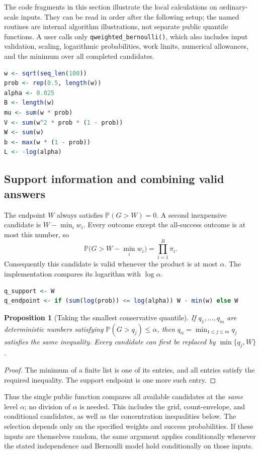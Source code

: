 \documentclass[11pt,letterpaper]{article}
\numberwithin{equation}{section}
\newtheorem{proposition}[theorem]{Proposition}
\theoremstyle{definition}
\theoremstyle{remark}
\begin{document}
The code fragments in this section illustrate the local calculations on
ordinary-scale inputs. They can be read in order after the following
setup; the named routines are internal algorithm illustrations, not
separate public quantile functions. A user calls only
\texttt{qweighted\_bernoulli()}, which also includes input validation,
scaling, logarithmic probabilities, work limits, numerical allowances,
and the minimum over all completed candidates.
\begin{lstlisting}[language=R]
w <- sqrt(seq_len(100))
prob <- rep(0.5, length(w))
alpha <- 0.025
B <- length(w)
mu <- sum(w * prob)
V <- sum(w^2 * prob * (1 - prob))
W <- sum(w)
b <- max(w * (1 - prob))
L <- -log(alpha)
\end{lstlisting}

\subsection{Support information and combining valid answers}

The endpoint $W$ always satisfies $\mathbb{P}(G>W)=0$. A second inexpensive
candidate is $W-\min_i w_i$. Every outcome except the all-success outcome is
at most this number, so
\begin{equation}
  \mathbb{P}\bigl(G>W-\min_i w_i\bigr)=\prod_{i=1}^B\pi_i.
  \label{eq:top-atom}
\end{equation}
Consequently this candidate is valid whenever the product is at most $\alpha$.
The implementation compares its logarithm with $\log\alpha$.
\begin{lstlisting}[language=R]
q_support <- W
q_endpoint <- if (sum(log(prob)) <= log(alpha)) W - min(w) else W
\end{lstlisting}

\begin{proposition}[Taking the smallest conservative quantile]
\label{prop:combine-quantiles}
If $q_1,\ldots,q_m$ are deterministic numbers satisfying
$\mathbb{P}(G>q_j)\le\alpha$, then
$q_\alpha=\min_{1\le j\le m}q_j$ satisfies the same inequality.
Every candidate can first be replaced by $\min\{q_j,W\}$.
\end{proposition}
\begin{proof}
The minimum of a finite list is one of its entries, and all entries satisfy
the required inequality. The support endpoint is one more such entry.
\end{proof}

Thus the single public function compares all available candidates at the
\emph{same} level $\alpha$; no division of $\alpha$ is needed. This includes
the grid, count-envelope, and conditional candidates, as well as the
concentration inequalities below. The selection depends only on the
specified weights and success probabilities. If these inputs are themselves
random, the same argument applies conditionally whenever the stated
independence and Bernoulli model hold conditionally on those inputs.
\end{document}
